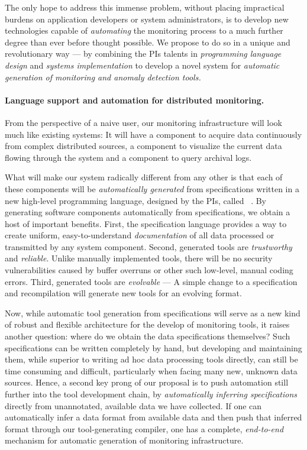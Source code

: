 The only hope to address this immense problem, without placing impractical
burdens on application developers or system administrators, is to develop
new technologies capable of {\em automating} the monitoring process
to a much further degree than ever before thought possible.  We propose to do
so in a unique and revolutionary way --- by combining the PIs talents
in {\em programming language design} and {\em systems implementation} to develop 
a novel system for {\em automatic generation of monitoring and anomaly 
detection tools.}

\paragraph*{Language support and automation for distributed monitoring.} 
From the perspective of a naive user,
our monitoring infrastructure will look much like
existing systems:  It will have 
a component to acquire data continuously 
from complex distributed sources, a component to visualize
the current data flowing through the system and a component 
to query archival logs.  

What will make our system radically different from any other is that each
of these components will be {\em automatically generated} from
specifications written in a new high-level programming language, 
designed by the PIs, called
\pads{}~\cite{fisher+:pads,fisher+:popl06,mandelbaum+:pads-ml}.  
By generating software components automatically from
specifications, we obtain a host of important benefits.  First, the
\pads{} specification language provides a way to create 
uniform, easy-to-understand {\em documentation} of all data processed
or transmitted by any system component.  Second, generated tools are
{\em trustworthy} and {\em reliable}. Unlike manually implemented
tools, there will be no security vulnerabilities caused by buffer
overruns or other such low-level, manual coding errors.  Third,
generated tools are {\em evolvable} --- A simple change to a
specification and recompilation will generate new tools for an
evolving format.

Now, while automatic tool generation from specifications will serve as 
a new kind of robust and flexible architecture for the develop of
monitoring tools, it raises another question: where do we obtain the
data specifications themselves?  Such specifications can be written completely
by hand, but developing and maintaining them,
while superior to writing ad hoc data processing tools directly, 
can still be time consuming and difficult, particularly when facing many
new, unknown data sources.  Hence, a second key prong of our proposal
is to push automation still further into the tool development chain,
by {\em automatically inferring specifications} directly from 
unannotated, available data we have collected.  If one can automatically
infer a data format from available data and then push that
inferred format through our tool-generating compiler, one has a
complete, {\em end-to-end} mechanism for automatic generation of
monitoring infrastructure. 

